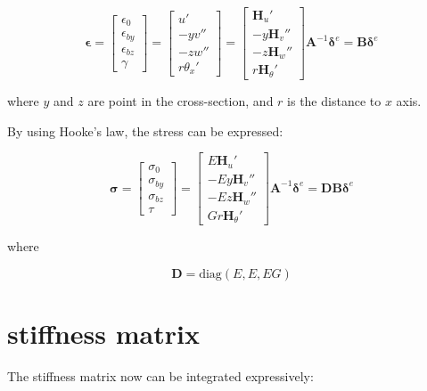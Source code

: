 \begin{equation}\label{key}
\mathbf{\epsilon} = \begin{bmatrix}
\epsilon_0 \\ 
\epsilon_{by} \\ 
\epsilon_{bz} \\ 
\gamma
\end{bmatrix} = \begin{bmatrix}
u' \\ 
-y v'' \\ 
-z w'' \\ 
r \theta_x'
\end{bmatrix} = \begin{bmatrix}
\mathbf{H}_u' \\ 
-y \mathbf{H}_v'' \\ 
-z \mathbf{H}_w'' \\ 
r \mathbf{H}_\theta'
\end{bmatrix} \mathbf{A}^{-1} \mathbf{\delta}^e = \mathbf{B} \mathbf{\delta}^e
\end{equation}

where $ y $ and $ z $ are point in the cross-section, and $ r $ is the distance to $ x $ axis.

By using Hooke's law, the stress can be expressed:

\begin{equation}\label{key}
\mathbf{\sigma} = \begin{bmatrix}
\sigma_0 \\ 
\sigma_{by} \\ 
\sigma_{bz} \\ 
\tau
\end{bmatrix} = \begin{bmatrix}
E\mathbf{H}_u' \\ 
-Ey \mathbf{H}_v'' \\ 
-Ez \mathbf{H}_w'' \\ 
Gr \mathbf{H}_\theta'
\end{bmatrix} \mathbf{A}^{-1} \mathbf{\delta}^e = \mathbf{DB} \mathbf{\delta}^e
\end{equation}

where 

\begin{equation}\label{key}
\mathbf{D} = \mathrm{diag}(E,E,EG)
\end{equation}

\section{stiffness matrix}
The stiffness matrix now can be integrated expressively:

